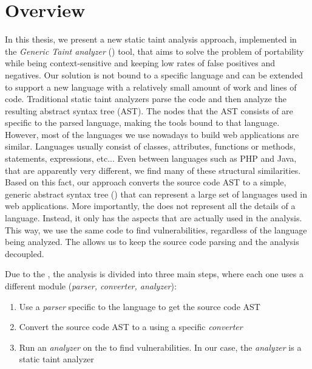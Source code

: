 \section{Overview}
In this thesis, we present a new static taint analysis approach, implemented in the {\it Generic Taint analyzer} (\toolname{}) tool, that aims to solve the problem of portability while being context-sensitive and keeping low rates of false positives and negatives. Our solution is not bound to a specific language and can be extended to support a new language with a relatively small amount of work and lines of code. 
Traditional static taint analyzers parse the code and then analyze the resulting abstract syntax tree (AST). The nodes that the AST consists of are specific to the parsed language, making the tools bound to that language. However, most of the languages we use nowadays to build web applications are similar. Languages usually consist of classes, attributes, functions or methods, statements, expressions, etc... Even between languages such as PHP and Java, that are apparently very different, we find many of these structural similarities. Based on this fact, our approach converts the source code AST to a simple, generic abstract syntax tree (\astname{}) that can represent a large set of languages used in web applications. More importantly, the \astname{} does not represent all the details of a language. Instead, it only has the aspects that are actually used in the analysis. This way, we  use the same code to find vulnerabilities, regardless of the language being analyzed. The \astname{} allows us to keep the source code parsing and the analysis decoupled.

Due to the \astname{}, the analysis is divided into three main steps, where each one uses a different module (\textit{parser, converter, analyzer}):

\begin{enumerate}
    \item Use a \textit{parser} specific to the language to get the source code AST
    \item Convert the source code AST to a \astname{} using a specific \textit{converter}

    \item Run an \textit{analyzer} on the \astname{} to find vulnerabilities. In our case, the \textit{analyzer} is a static taint analyzer
\end{enumerate}

